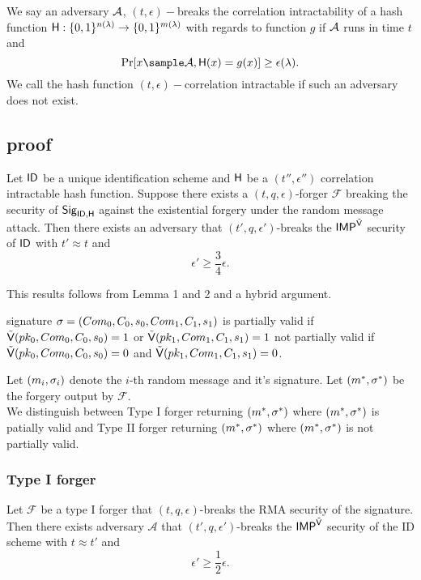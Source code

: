 \begin{definition}
We say an adversary $\mathcal{A}$, $(t, \epsilon)-$breaks the correlation intractability of a hash function  $\mathsf{H}: \{0,1\}^{n(\lambda)} \rightarrow \{0,1\}^{m(\lambda)}$ with regards to function $g$ if $\mathcal{A}$ runs in time $t$ and 
$$\Pr[x \sample \adv, \Hash(x) = g(x)] \geq \epsilon(\lambda).$$
We call the hash function $(t, \epsilon)-$correlation intractable if such an adversary does not exist.
\end{definition}




\subsection{proof}
\begin{theorem}
Let  $\mathsf{ID}$ be a unique identification scheme and $\mathsf{H}$ be a $(t'',\epsilon'')$ correlation intractable hash function. Suppose there exists a $(t,q,\epsilon)$-forger $\mathcal{F}$ breaking the security of $\mathsf{Sig}_{\mathsf{ID},\mathsf{H}}$ against the existential forgery under the random message attack. Then there exists an adversary that $(t',q,\epsilon')$-breaks the $\mathsf{IMP}^{\tilde{\mathsf{V}}}$ security of $\mathsf{ID}$ with $t' \approx t$ and
$$ \epsilon' \geq \frac{3}{4}\epsilon .$$
\end{theorem}
This results follows from Lemma 1 and 2 and a hybrid argument.

\begin{definition}
signature  $\sigma = (Com_{0},C_{0},s_{0}, Com_{1}, C_{1},s_{1})$ is
partially valid if $\tilde{\mathsf{V}}(pk_0,Com_0,C_0,s_0) =1$ or $\tilde{\mathsf{V}}(pk_1,Com_1,C_1,s_1) = 1$
not partially valid if 
 $\tilde{\mathsf{V}}(pk_0,Com_0,C_0,s_0) =0$ and $\tilde{\mathsf{V}}(pk_1,Com_1,C_1,s_1) =0$.

\end{definition}

Let $(m_i,\sigma_i)$ denote the $i$-th random message and it's signature. Let $(m^*,\sigma^*)$ be the forgery output by $\mathcal{F}$.
\\
We distinguish between Type I forger returning $(m^*, \sigma^*)$ where $(m^*, \sigma^*)$ is patially valid  and Type II forger returning  $(m^*, \sigma^*)$ where $(m^*, \sigma^*)$ is not partially valid.
\subsubsection{Type I forger} 
\begin{lemma}
Let $\mathcal{F}$ be a type I forger that $(t,q,\epsilon)$-breaks the RMA security of the signature. Then there exists adversary $\mathcal{A}$ that $(t',q,\epsilon')$-breaks the $\mathsf{IMP}^{\tilde{\mathsf{V}}}$ security of the ID scheme with 
$t \approx t'$ and 
$$\epsilon' \geq \frac{1}{2} \epsilon.$$
\end{lemma}

